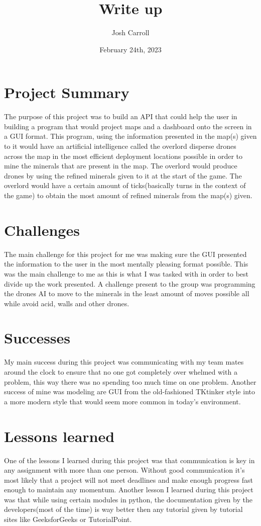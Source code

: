 \documentclass{report}
\title{Write up}
\author{Josh Carroll}
\date{February 24th, 2023}
\begin{document}
\maketitle
\section{Project Summary}
    The purpose of this project was to build an API that could help the user in building a program that would project maps and a dashboard onto the screen in a GUI format. This program, using the information presented in the map(s) given to it would have an artificial intelligence called the overlord disperse drones across the map in the most efficient deployment locations possible in order to mine the minerals that are present in the map. The overlord would produce drones by using the refined minerals given to it at the start of the game. The overlord would have a certain amount of ticks(basically turns in the context of the game) to obtain the most amount of refined minerals from the map(s) given.
\section{Challenges}
    The main challenge for this project for me was making sure the GUI presented the information to the user in the most mentally pleasing format possible. This was the main challenge to me as this is what I was tasked with in order to best divide up the work presented. A challenge present to the group was programming the drones AI to move to the minerals in the least amount of moves possible all while avoid acid, walls and other drones.
\section{Successes}
    My main success during this project was communicating with my team mates around the clock to ensure that no one got completely over whelmed with a problem, this way there was no spending too much time on one problem.
    Another success of mine was modeling are GUI from the old-fashioned TKtinker style into a more modern style that would seem more common in today's environment.
\section{Lessons learned}
    One of the lessons I learned during this project was that communication is key in any assignment with more than one person. Without good communication it's most likely that a project will not meet deadlines and make enough progress fast enough to maintain any momentum. Another lesson I learned during this project was that while using certain modules in python, the documentation given by the developers(most of the time) is way better then any tutorial given by tutorial sites like GeeksforGeeks or TutorialPoint.
\end{document}

